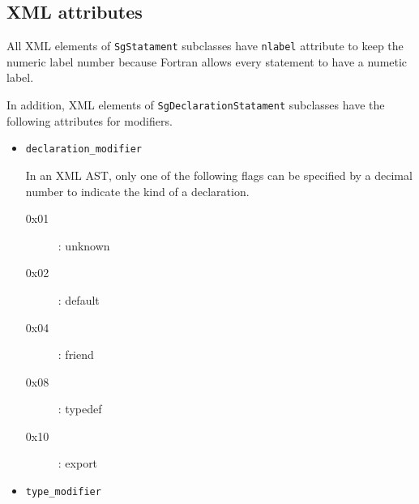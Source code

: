 \subsection{XML attributes}\label{sec:stmtatt}
All XML elements of \texttt{SgStatament} subclasses have \texttt{nlabel}
attribute to keep the numeric label number because Fortran allows every
statement to have a numetic label. 

In addition, XML elements of \texttt{SgDeclarationStatament} subclasses
have the following attributes for modifiers.
\begin{itemize}
 \item \texttt{declaration\_modifier} 

       In an XML AST, only one of the following flags can be specified
       by a decimal number to indicate the kind of a declaration.
       \begin{description}
	\item[0x01]: unknown 
	\item[0x02]: default
	\item[0x04]: friend
	\item[0x08]: typedef
	\item[0x10]: export
       \end{description}
 \item \texttt{type\_modifier} 


\end{itemize}

